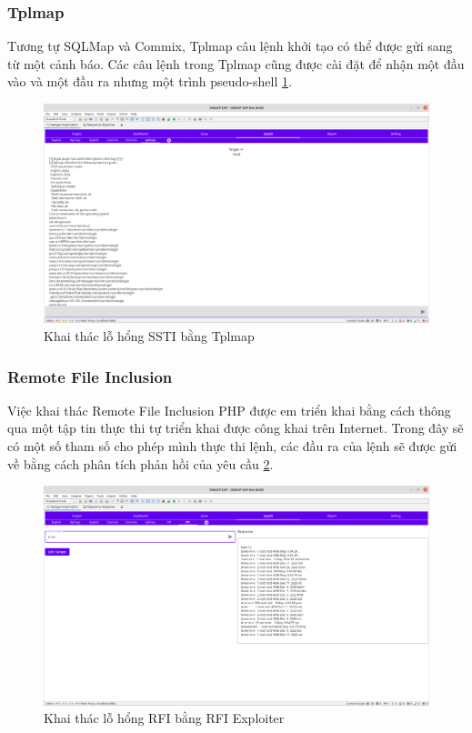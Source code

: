 \documentclass[./../main.tex]{subfiles}
\begin{document}
\subsubsection{Tplmap}
Tương tự SQLMap và Commix, Tplmap  câu lệnh khởi tạo có thể được gửi
sang từ một cảnh báo.
Các câu lệnh trong Tplmap cũng được cài đặt để nhận một đầu vào và
một đầu ra nhưng một trình pseudo-shell \ref{fig:tplmap_exploit}.

\begin{figure}[h!]
	\includegraphics[width=\linewidth]{./images/tplmap_exploit.png}
	\caption{Khai thác lỗ hổng SSTI bằng Tplmap}
	\label{fig:tplmap_exploit}
\end{figure}

\subsubsection{Remote File Inclusion}

Việc khai thác Remote File Inclusion PHP được em triển khai bằng cách
thông qua một tập tin thực thi tự triển khai được công khai trên Internet.
Trong đây sẽ có một số tham số cho phép mình thực thi lệnh, các đầu ra
của lệnh sẽ được gửi về bằng cách phân tích phản hồi của yêu cầu \ref{fig:rfi_exploit}.

\begin{figure}[h!]
	\includegraphics[width=\linewidth]{./images/rfi_exploit.png}
	\caption{Khai thác lỗ hổng RFI bằng RFI Exploiter}
	\label{fig:rfi_exploit}
\end{figure}
\end{document}
